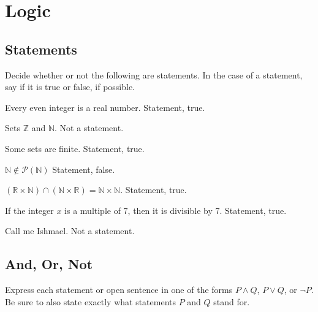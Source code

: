 \documentclass[DIN, pagenumber=false, fontsize=11pt, parskip=half]{scrartcl}
\title{}
\author{} %
\date{}
\begin{document}
\maketitle

\setcounter{section}{1}

\section{Logic}

\subsection{Statements}

\begin{exercise}{}
    Decide whether or not the following are statements. In the case of a statement, say if it is true or false, if possible.
\end{exercise}

\begin{problems}
    \problem Every even integer is a real number.
    \answer  Statement, true.

    \problem Sets $\mathbb{Z}$ and $\mathbb{N}$.
    \answer  Not a statement.

    \problem Some sets are finite.
    \answer  Statement, true.

    \problem $\mathbb{N} \notin \mathcal{P}(\mathbb{N})$
    \answer  Statement, false.

    \problem $(\mathbb{R} \times \mathbb{N}) \cap (\mathbb{N} \times \mathbb{R}) = \mathbb{N} \times \mathbb{N}$.
    \answer  Statement, true.

    \problem If the integer $x$ is a multiple of 7, then it is divisible by 7.
    \answer  Statement, true.

    \problem Call me Ishmael.
    \answer  Not a statement.
\end{problems}

\subsection{And, Or, Not}

\begin{exercise}{}
    Express each statement or open sentence in one of the forms $P \land Q$, $P \lor Q$, or $\lnot P$. Be sure to also state exactly what statements $P$ and $Q$ stand for.
\end{exercise}
\end{document}
